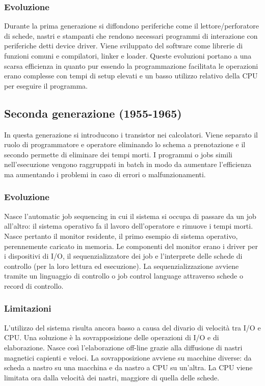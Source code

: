\subsubsection{Evoluzione}
Durante la prima generazione si diffondono periferiche come il lettore/perforatore di schede, nastri e stampanti che rendono necessari programmi di interazione con periferiche detti device driver. Viene 
sviluppato del software come librerie di funzioni comuni e compilatori, linker e loader. Queste evoluzioni portano a una scarsa efficienza in quanto pur essendo la programmazione facilitata le operazioni erano 
complesse con tempi di setup elevati e un basso utilizzo relativo della CPU per eseguire il programma.
\subsection{Seconda generazione (1955-1965)}
In questa generazione si introducono i transistor nei calcolatori. Viene separato il ruolo di programmatore e operatore eliminando lo schema  a prenotazione e il secondo permette di eliminare dei tempi morti. 
I programmi o jobs simili nell'esecuzione vengono raggruppati in batch in modo da aumentare l'efficienza ma aumentando i problemi in caso di errori o malfunzionamenti. 
\subsubsection{Evoluzione}
Nasce l'automatic job sequencing in cui il sistema si occupa di passare da un job all'altro: il sistema operativo fa il lavoro dell'operatore e rimuove i tempi morti. Nasce pertanto il monitor residente, il primo 
esempio di sistema operativo, perennemente caricato in memoria. Le componenti del monitor erano i driver per i dispositivi di I/O, il sequenzializzatore dei job e l'interprete delle schede di controllo (per la loro
lettura ed esecuzione). La sequenzializzazione avviene tramite un linguaggio di controllo o job control language attraverso schede o record di controllo. 
\subsubsection{Limitazioni}
L'utilizzo del sistema risulta ancora basso a causa del divario di velocit\`a tra I/O e CPU. Una soluzione \`e la sovrapposizione delle operazioni di I/O e di elaborazione. Nasce cos\`i l'elaborazione off-line grazie 
alla diffusione di nastri magnetici capienti e veloci. La sovrapposizione avviene su macchine diverse: da scheda a nastro su una macchina e da nastro a CPU su un'altra. La CPU viene limitata ora dalla velocit\`a dei
nastri, maggiore di quella delle schede. 
